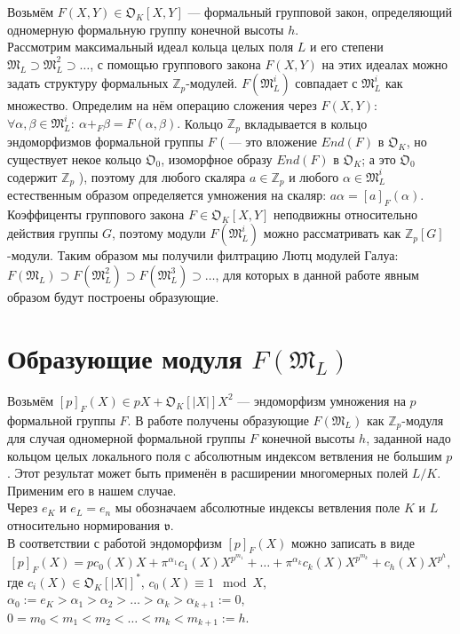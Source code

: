 \documentclass[a4paper]{article}
\newcommand{\Zp}{\mathbb{Z}_p}
\newcommand{\ML}{\mathfrak{M}_L}
\newcommand{\OK}{\mathfrak{O}_K}
\newcommand{\val}{\mathfrak{v}}
\begin{document}
Возьмём $F(X,Y)\in\OK[X,Y]$ --- формальный групповой закон, определяющий одномерную формальную группу конечной высоты $h$.\\ 
Рассмотрим максимальный идеал кольца целых поля $L$ и его степени $\ML\supset\ML^2\supset\dots$, с помощью группового закона $F(X,Y)$ на этих идеалах можно задать структуру формальных $\Zp$-модулей. $F(\ML^i)$ совпадает с $\ML^i$ как множество. Определим на нём операцию сложения через $F(X,Y)$: $\forall\alpha,\beta\in\ML^i:\ \alpha+_F\beta=F(\alpha,\beta).$ Кольцо $\Zp$ вкладывается в кольцо эндоморфизмов формальной группы $F$ (\cite[\S 2]{book6} --- это вложение $End(F)$ в $\OK$, но существует некое кольцо $\mathfrak{O}_0$, изоморфное образу $End(F)$ в $\OK$; а это $\mathfrak{O}_0$ содержит $\Zp$ \cite[\S2.3]{book6}), поэтому для любого скаляра $a\in\Zp$ и любого $\alpha\in\ML^i$ естественным образом определяется умножения на скаляр: $a\alpha=[a]_F(\alpha)$.\\
Коэффиценты группового закона $F \in \OK[X,Y]$ неподвижны относительно действия группы $G$, поэтому модули $F(\ML^i)$ можно рассматривать как $\Zp[G]$-модули. Таким образом мы получили филтрацию Лютц модулей Галуа: $F(\ML) \supset F(\ML^2) \supset F(\ML^3) \supset \ldots$, для которых в данной работе явным образом будут построены образующие.

\section{Образующие модуля $F(\ML)$}

Возьмём $[p]_F(X) \in pX+\OK[|X|]X^2$ --- эндоморфизм умножения на $p$ формальной группы $F$. В работе \cite[Арифметика формального модуля]{book2} получены образующие $F(\ML)$ как $\Zp$-модуля для случая одномерной формальной группы $F$ конечной высоты $h$, заданной надо кольцом целых локального поля с абсолютным индексом ветвления не большим $p$. Этот результат может быть применён в расширении многомерных полей $L/K$. Применим его в нашем случае.\\

Через $e_K$ и $e_L = e_n$ мы обозначаем абсолютные индексы ветвления поле $K$ и $L$ относительно нормирования $\val$. \\
В соответствии с работой \cite{book2} эндоморфизм $[p]_F(X)$ можно записать в виде
$$[p]_F(X)=pc_0(X)X+\pi^{\alpha_1}c_1(X)X^{p^{m_1}}+\dots+\pi^{\alpha_k}c_k(X)X^{p^{m_k}}+c_h(X)X^{p^h},$$
где $c_i(X) \in \OK[|X|]^*$, $c_0(X) \equiv 1 \mod X$, $\alpha_0:=e_K>\alpha_1>\alpha_2>\dots>\alpha_k>\alpha_{k+1}:=0$, $0=m_0<m_1<m_2<\dots<m_k<m_{k+1}:=h$.
\end{document}

